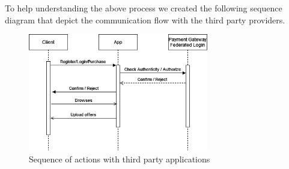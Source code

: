 To help understanding the above process we created the following \gls{sequence diagram} that depict the communication flow 
with the third party providers. 


\begin{figure}[H]
    \centering
    \includegraphics[width=0.7\textwidth]{assets/sequence_login_payment.jpg}
    \caption{Sequence of actions with third party applications}
    \label{fig:sequence_login_payment}
\end{figure}



